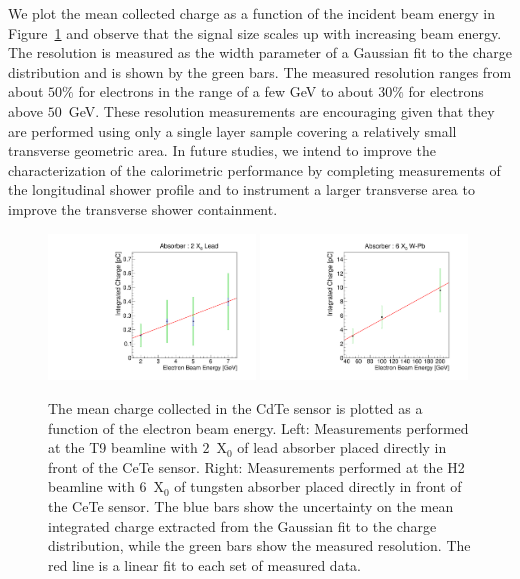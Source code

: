 We plot the mean collected charge as a function of the incident beam energy
in Figure~\ref{fig:ChargeVsEnergy} and observe that the signal size scales
up with increasing beam energy. The resolution is measured as the width
parameter of a Gaussian fit to the charge distribution and is shown by the green bars. 
The measured resolution ranges from
about $50\%$ for electrons in the range of a few GeV to 
about $30\%$ for electrons above $50$~GeV. 
These resolution measurements are encouraging given that they are performed
using only a single layer sample covering a relatively small transverse
geometric area. In future studies, we intend to improve the characterization
of the calorimetric performance by completing measurements of the
longitudinal shower profile and to instrument a larger transverse 
area to improve the transverse shower containment. 

\begin{figure}[htbp] 
\centering
\includegraphics[width=0.49\textwidth]{figures/ChargeVsEnergyAt2X0.pdf} 
\includegraphics[width=0.49\textwidth]{figures/ChargeVsEnergyAt6X0.pdf} 
\caption{ The mean charge collected in the CdTe sensor is plotted as a function
of the electron beam energy. Left: Measurements performed at the T9 beamline
with $2$~$\mathrm{X}_{0}$ of lead absorber placed directly in front of the 
CeTe sensor. Right: Measurements performed at the H2 beamline
with $6$~$\mathrm{X}_{0}$ of tungsten absorber placed directly in front of the 
CeTe sensor. The blue bars show the uncertainty on the mean integrated charge
extracted from the Gaussian fit to the charge distribution, while the green 
bars show the measured resolution. The red line is a 
linear fit to each set of measured data. } 
\label{fig:ChargeVsEnergy} 
\end{figure} 


